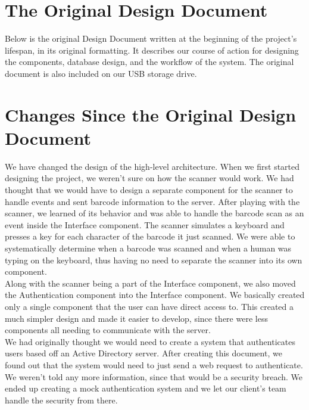 \documentclass[10pt, onecolumn, twoside, peerreview]{IEEEtran}
\begin{document}
\section{The Original Design Document}

Below is the original Design Document written at the beginning of the project's lifespan, in its original formatting.
It describes our course of action for designing the components, database design, and the workflow of the system. The
original document is also included on our USB storage drive.



\section {Changes Since the Original Design Document}
We have changed the design of the high-level architecture. When we first started designing the project, we weren’t sure on how the scanner would work. We had thought that we would have to design a separate component for the scanner to handle events and sent barcode information to the server. After playing with the scanner, we learned of its behavior and was able to handle the barcode scan as an event inside the Interface component. The scanner simulates a keyboard and presses a key for each character of the barcode it just scanned. We were able to systematically determine when a barcode was scanned and when a human was typing on the keyboard, thus having no need to separate the scanner into its own component.\\

Along with the scanner being a part of the Interface component, we also moved the Authentication component into the Interface component. We basically created only a single component that the user can have direct access to. This created a much simpler design and made it easier to develop, since there were less components all needing to communicate with the server.\\

We had originally thought we would need to create a system that authenticates users based off  an Active Directory server. After creating this document, we found out that the system would need to just send a web request to authenticate. We weren’t told any more information, since that would be a security breach. We ended up creating a mock authentication system and we let our client’s team handle the security from there.\\
\end{document}
